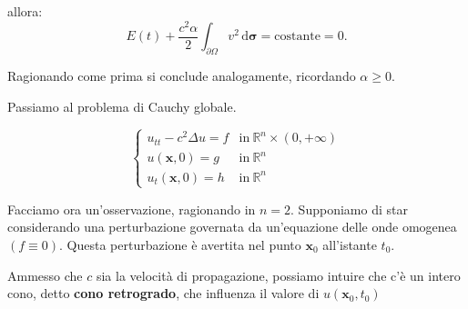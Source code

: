 \documentclass[10pt,a4paper,twoside,openright]{book}
\newcommand{\x}{\mathbf{x}}
\newcommand{\sigg}{\bm{\sigma}}
\newcommand{\de}{\,\mathrm d}
\newcommand{\dsig}{\de \sigg}
\begin{document}
\begin{dimostrazione}
\begin{itemize}
		      allora:
		      \begin{equation*}
		      	E(t) +\frac{c^{2} \alpha }{2}\int _{\partial \Omega } v^{2} \dsig =\text{costante} =0.
		      \end{equation*}
		      
		      Ragionando come prima si conclude analogamente, ricordando $\alpha \geqslant 0$.
	\end{itemize}
\end{dimostrazione}


Passiamo al problema di Cauchy globale.

\begin{equation}
	\begin{cases}
		u_{tt} -c^{2} \Delta u=f & \text{in} \ \mathbb{R}^{n} \times (0,+\infty) \\
		u(\x ,0) =g      & \text{in} \ \mathbb{R}^{n}                      \\
		u_{t}(\x ,0) =h  & \text{in} \ \mathbb{R}^{n}                      
	\end{cases}
	\label{eq:pcg-onde-unicita}
\end{equation}

Facciamo ora un'osservazione, ragionando in $n=2$. Supponiamo di star considerando una perturbazione governata da un'equazione delle onde omogenea $(f\equiv 0)$. Questa perturbazione è avertita nel punto $\x_{0}$ all'istante $t_{0}$.

Ammesso che $c$ sia la velocità di propagazione, possiamo intuire che c'è un intero cono, detto \textbf{cono retrogrado}, che influenza il valore di $u(\x_{0} ,t_{0})$

\end{document}
